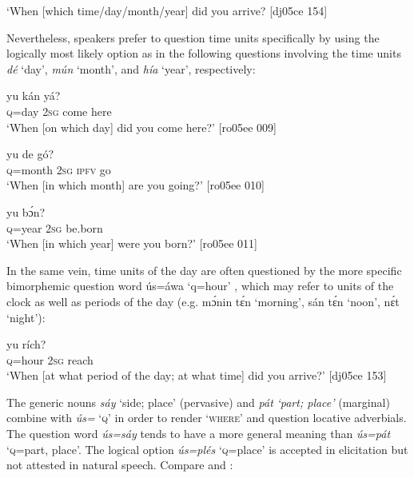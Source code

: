 \glt ‘When [which time/day/month/year] did you arrive? [dj05ce 154]
\z

Nevertheless, speakers prefer to question time units specifically by using the logically most likely option as in the following questions involving the time units \textit{dé} ‘day’, \textit{mún} ‘month’, and \textit{hía} ‘year’, respectively: 


\ea%
    \label{ex:key:623}
    \gll {}  yu  kán    yá?\\
\textsc{q}=day  \textsc{2sg}  come  here\\

\glt ‘When [on which day] did you come here?’ [ro05ee 009] 
\z


\ea%
    \label{ex:key:624}
    \gll {}    yu  de  gó?\\
\textsc{q}=month    \textsc{2sg}  \textsc{ipfv}  go\\

\glt ‘When [in which month] are you going?’ [ro05ee 010]
\z


\ea%
    \label{ex:key:625}
    \gll {}  yu  bɔ́n?\\
\textsc{q}=year  \textsc{2sg}  be.born\\

\glt ‘When [in which year] were you born?’ [ro05ee 011]
\z

In the same vein, time units of the day are often questioned by the more specific bimorphemic question word ús=áwa ‘q=hour’ , which may refer to units of the clock as well as periods of the day (e.g. mɔ́nin tɛ́n ‘morning’, sán tɛ́n ‘noon’, nɛ́t ‘night’):


\ea%
    \label{ex:key:626}
    \gll {}  yu  rích?\\
\textsc{q}=hour  \textsc{2sg}  reach\\

\glt ‘When [at what period of the day; at what time] did you arrive?’ [dj05ce 153]
\z

The generic nouns \textit{sáy} ‘side; place’ (pervasive) and \textit{pát} \textit{\textup{‘part; place’} }(marginal) combine with \textit{ús=} ‘\textsc{q}’ in order to render ‘\textsc{where’} and question locative adverbials. The question word \textit{ús=sáy} tends to have a more general meaning than \textit{ús=pát} ‘\textsc{q}=part, place’. The logical option \textit{ús=plés} ‘\textsc{q}=place’ is accepted in elicitation but not attested in natural speech. Compare  and :


